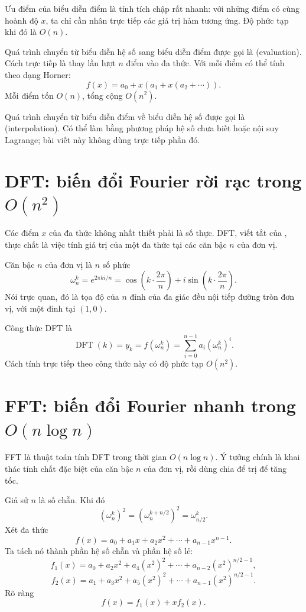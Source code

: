 \documentclass[11pt]{article}
\begin{document}
Ưu điểm của biểu diễn điểm là tính tích chập rất nhanh: với những điểm có cùng
hoành độ $x$, ta chỉ cần nhân trực tiếp các giá trị hàm tương ứng. Độ phức tạp
khi đó là $O(n)$.

Quá trình chuyển từ biểu diễn hệ số sang biểu diễn điểm được gọi là
 (evaluation). Cách trực tiếp là thay lần lượt $n$ điểm vào
đa thức. Với mỗi điểm có thể tính theo dạng Horner:
\[
  f(x)=a_0+x(a_1+x(a_2+\cdots)).
\]
Mỗi điểm tốn $O(n)$, tổng cộng $O(n^2)$.

Quá trình chuyển từ biểu diễn điểm về biểu diễn hệ số được gọi là
 (interpolation). Có thể làm bằng phương pháp hệ số chưa biết
hoặc nội suy Lagrange; bài viết này không dùng trực tiếp phần đó.

\section{\texorpdfstring{DFT: biến đổi Fourier rời rạc trong $O(n^2)$}{DFT: biến đổi Fourier rời rạc trong O(n\textasciicircum 2)}}

Các điểm $x$ của đa thức không nhất thiết phải là số thực. DFT, viết tắt của
, thực chất là việc tính giá trị của một đa
thức tại các căn bậc $n$ của đơn vị.

Căn bậc $n$ của đơn vị là $n$ số phức
\[
  \omega_n^k=e^{2\pi ki/n}
  =\cos\left(k\cdot\frac{2\pi}{n}\right)
  + i\sin\left(k\cdot\frac{2\pi}{n}\right).
\]
Nói trực quan, đó là tọa độ của $n$ đỉnh của đa giác đều nội tiếp đường tròn
đơn vị, với một đỉnh tại $(1,0)$.

Công thức DFT là
\[
  \operatorname{DFT}(k)=y_k=f(\omega_n^k)
  =\sum_{i=0}^{n-1} a_i(\omega_n^k)^i.
\]
Cách tính trực tiếp theo công thức này có độ phức tạp $O(n^2)$.

\section{\texorpdfstring{FFT: biến đổi Fourier nhanh trong $O(n\log n)$}{FFT: biến đổi Fourier nhanh trong O(n log n)}}

FFT là thuật toán tính DFT trong thời gian $O(n\log n)$. Ý tưởng chính là khai
thác tính chất đặc biệt của căn bậc $n$ của đơn vị, rồi dùng chia để trị để
tăng tốc.

Giả sử $n$ là số chẵn. Khi đó
\[
  (\omega_n^k)^2=(\omega_n^{k+n/2})^2=\omega_{n/2}^{k}.
\]
Xét đa thức
\[
  f(x)=a_0+a_1x+a_2x^2+\cdots+a_{n-1}x^{n-1}.
\]
Ta tách nó thành phần hệ số chẵn và phần hệ số lẻ:
\[
  f_1(x)=a_0+a_2x^2+a_4(x^2)^2+\cdots+a_{n-2}(x^2)^{n/2-1},
\]
\[
  f_2(x)=a_1+a_3x^2+a_5(x^2)^2+\cdots+a_{n-1}(x^2)^{n/2-1}.
\]
Rõ ràng
\[
  f(x)=f_1(x)+x f_2(x).
\]
\end{document}
